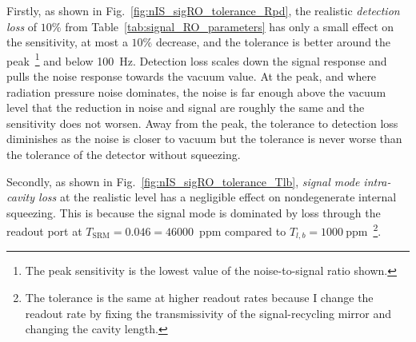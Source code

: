 Firstly, as shown in Fig.~\ref{fig:nIS_sigRO_tolerance_Rpd}, the realistic \emph{detection loss} of $10\%$ from Table~\ref{tab:signal_RO_parameters} has only a small effect on the sensitivity, at most a $10\%$ decrease, and the tolerance is better around the peak~\footnote{The peak sensitivity is the lowest value of the noise-to-signal ratio shown.} and below 100~Hz.
Detection loss scales down the signal response and pulls the noise response towards the vacuum value. At the peak, and where radiation pressure noise dominates, the noise is far enough above the vacuum level that the reduction in noise and signal are roughly the same and the sensitivity does not worsen. Away from the peak, the tolerance to detection loss diminishes as the noise is closer to vacuum but the tolerance is never worse than the tolerance of the detector without squeezing. %

Secondly, as shown in Fig.~\ref{fig:nIS_sigRO_tolerance_Tlb}, \emph{signal mode intra-cavity loss} at the realistic level has a negligible effect on nondegenerate internal squeezing. This is because the signal mode is dominated by loss through the readout port at $T_\text{SRM}=0.046=46000$~ppm compared to $T_{l,b}=1000~\text{ppm}$~\footnote{The tolerance is the same at higher readout rates because I change the readout rate by fixing the transmissivity of the signal-recycling mirror and changing the cavity length.}. %

